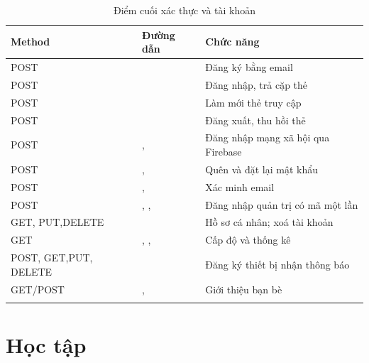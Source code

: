 \begin{longtable}{L{2.8cm} L{5.8cm} L{5.0cm}}
\toprule
\textbf{Method} & \textbf{Đường dẫn} & \textbf{Chức năng}\\
\midrule
\endhead
POST &  & Đăng ký bằng email\\
POST &  & Đăng nhập, trả cặp thẻ\\
POST &  & Làm mới thẻ truy cập\\
POST &  & Đăng xuất, thu hồi thẻ\\
POST & ,  & Đăng nhập mạng xã hội qua Firebase\\
POST & ,  & Quên và đặt lại mật khẩu\\
POST & ,  & Xác minh email\\
POST & , ,  & Đăng nhập quản trị có mã một lần\\
GET, PUT,\newline DELETE &  & Hồ sơ cá nhân; xoá tài khoản\\
GET & , ,  & Cấp độ và thống kê\\
POST, GET,\newline PUT, DELETE &  & Đăng ký thiết bị nhận thông báo\\
GET/POST & ,  & Giới thiệu bạn bè\\
\bottomrule
\caption{Điểm cuối xác thực và tài khoản}
\end{longtable}

\section{Học tập}

